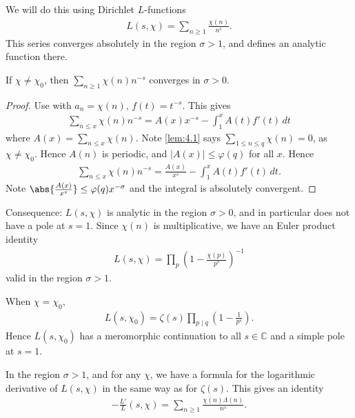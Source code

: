 \documentclass{article}
\newcommand{\1}{\mathbbm{1}}
\begin{document}
We will do this using Dirichlet $L$-functions
\begin{align*}
  L(s,\chi) = \sum_{n \geq 1} \frac{\chi(n)}{n^s}.
\end{align*}
This series converges absolutely in the region $\sigma > 1$, and defines an analytic function there.
\begin{nlemma}
  If $\chi \neq \chi_0$, then $ \sum_{n \geq 1} \chi(n){n^{-s}} $ converges in $\sigma > 0$.
\end{nlemma}
\begin{proof}
  Use  with $a_n = \chi(n)$, $f(t) = t^{-s}$.
  This gives
  \begin{align*}
    \sum_{n \leq x} \chi(n) n^{-s} = A(x) x^{-s} - \int_{1}^x A(t) f'(t)\,dt
  \end{align*}
  where $A(x) = \sum_{n \leq x} \chi(n)$.
  Note \cref{lem:4.1} says $\sum_{1 \leq n \leq q} \chi(n) = 0$, as $\chi \neq \chi_0$. Hence $A(n)$ is periodic, and $|A(x)| \leq \varphi(q)$ for all $x$.
  Hence
  \begin{align*}
    \sum_{n \leq x} \chi(n) n^{-s} = \frac{A(x)}{x^s} - \int_{1}^x A(t)f'(t)\,dt.
  \end{align*}
  Note $\abs{\frac{A(x)}{x^s}} \leq \varphi(q) x^{-\sigma}$ and the integral is absolutely convergent.
\end{proof}
Consequence: $L(s,\chi)$ is analytic in the region $\sigma>0$, and in particular does not have a pole at $s=1$.
Since $\chi(n)$ is multiplicative, we have an Euler product identity
\begin{align*}
  L(s,\chi) = \prod_p \left(1-\frac{\chi(p)}{p^s}\right)^{-1}
\end{align*}
valid in the region $\sigma > 1$.

\begin{remark}
  When $\chi = \chi_0$,
  \begin{align*}
    L(s,\chi_0) = \zeta(s) \prod_{p \mid q} \left(1 - \frac{1}{p^s}\right).
  \end{align*}
  Hence $L(s,\chi_0)$ has a meromorphic continuation to all $s \in \mathbb{C}$ and a simple pole at $s=1$.
\end{remark}
\begin{remark}
  In the region $\sigma>1$, and for any $\chi$, we have a formula for the logarithmic derivative of $L(s,\chi)$ in the same way as for $\zeta(s)$.
  This gives an identity
  \begin{align*}
    -\frac{L'}{L}(s,\chi) = \sum_{n \geq 1} \frac{\chi(n) \Lambda(n)}{n^{s}}.
  \end{align*}
\end{remark}
\end{document}
